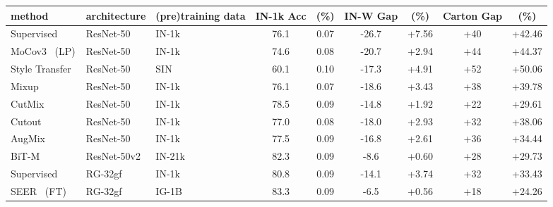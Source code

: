 \documentclass[10pt,twocolumn,letterpaper]{article}
\begin{document}
\begin{table*}[h]
\centering
{}
\begin{adjustbox}{width=\linewidth}
\begin{tabular}{@{}lll|cc|cc|cc@{}}
\toprule
method  & architecture & (pre)training data                  & IN-1k Acc  &  (\%) & IN-W Gap  &  (\%)  & Carton Gap  &  (\%)  \\ \midrule
Supervised     & ResNet-50~\cite{he2016IEEEConf.Comput.Vis.PatternRecognit.CVPRDeep}    & IN-1k~\cite{deng2009IEEEConf.Comput.Vis.PatternRecognit.CVPRImageNet}                       & 76.1       & 0.07           & -26.7 & +7.56  & +40 &  +42.46    \\
MoCov3~\cite{chen2021IEEECVFInt.Conf.Comput.Vis.ICCVEmpirical} (LP)     & ResNet-50    & IN-1k                       &  74.6  & 0.08                & -20.7 & +2.94  & +44 &  +44.37    \\
Style Transfer~\cite{geirhos2019Int.Conf.Learn.Represent.ImageNettrained}  & ResNet-50    & SIN~\cite{geirhos2019Int.Conf.Learn.Represent.ImageNettrained}                       & 60.1   &   0.10             & -17.3 & +4.91  & +52 &   +50.06    \\
Mixup~\cite{zhang2018Int.Conf.Learn.Represent.mixup}     & ResNet-50    & IN-1k                       &  76.1  & 0.07                & -18.6 & +3.43  & +38 &  +39.78    \\
CutMix~\cite{yun2019IEEECVFInt.Conf.Comput.Vis.ICCVCutMix}     & ResNet-50    & IN-1k                       &  78.5  & 0.09                & -14.8 & +1.92  & +22 &  +29.61    \\
Cutout~\cite{devries2017Improved,zhong2020AAAIConf.Artif.Intell.Random}     & ResNet-50    & IN-1k                       &  77.0  & 0.08                & -18.0 & +2.93  & +32 &  +38.06    \\
AugMix~\cite{hendrycks2020Int.Conf.Learn.Represent.AugMixa}     & ResNet-50    & IN-1k                       &  77.5  & 0.09                & -16.8 & +2.61  & +36 &  +34.44    \\
BiT-M~\cite{kolesnikov2020Eur.Conf.Comput.Vis.ECCVBig}     & ResNet-50v2~\cite{he2016Eur.Conf.Comput.Vis.ECCVIdentity}    & IN-21k                       &  82.3  & 0.09                & -8.6 & +0.60  & +28 &  +29.73    \\
\midrule
Supervised     & RG-32gf      & IN-1k                       & 80.8  &   0.09                    & -14.1  &  +3.74     & +32 &     +33.43       \\
SEER~\cite{goyal2022Vision} (FT) & RG-32gf~\cite{radosavovic2020IEEECVFConf.Comput.Vis.PatternRecognit.CVPRDesigning}      & IG-1B~\cite{goyal2022Vision}  & 83.3 &    0.09                    & -6.5  &  +0.56       & +18   &  +24.26        \\

\end{tabular}
\end{adjustbox}
\end{table*}
\end{document}
